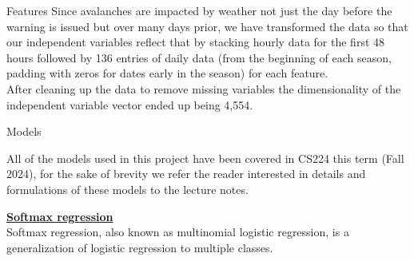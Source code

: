 \documentclass[final]{beamer}
\newlength{\colwidth}
\begin{document}
\begin{frame}[t]
\begin{columns}[t]
\begin{column}{\colwidth}
\begin{block}{Features}
Since avalanches are impacted by weather not just the day before the warning is issued but over many days prior, we have transformed the data so that our independent variables reflect that by stacking hourly data for the first 48 hours followed by 136 entries of daily data (from the beginning of each season, padding with zeros for dates early in the season) for each feature. \\
After cleaning up the data to remove missing variables the dimensionality of the independent variable vector ended up being 4,554.


    
\end{block}

  \begin{block}{Models}

 All of the models used in this project have been covered in CS224 this term (Fall 2024), for the sake of brevity we refer the reader interested in details and formulations of these models to the lecture notes.
   
 \underline{\textbf{Softmax regression}}\\

	Softmax regression, also known as multinomial logistic regression, is a generalization of logistic regression to multiple classes.
    


\end{block}
\end{column}
\end{columns}
\end{frame}
\end{document}
